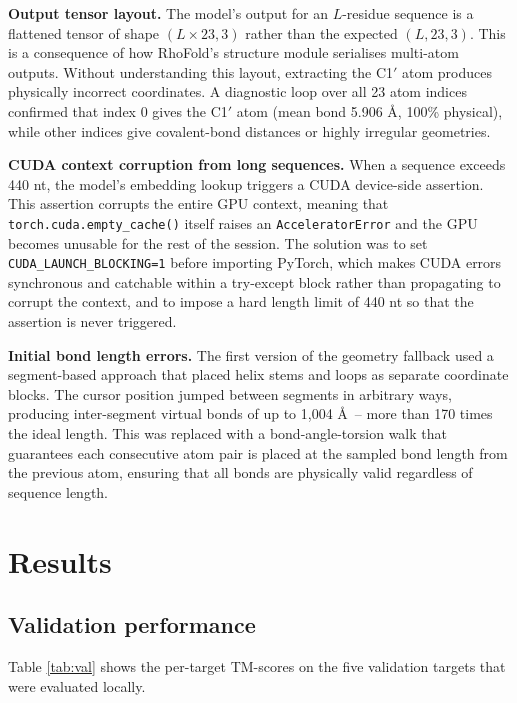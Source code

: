 \documentclass[11pt,a4paper]{article}
\begin{document}
\textbf{Output tensor layout.} The model's output for an $L$-residue sequence is a flattened tensor of shape $(L \times 23, 3)$ rather than the expected $(L, 23, 3)$. This is a consequence of how RhoFold's structure module serialises multi-atom outputs. Without understanding this layout, extracting the C1$'$ atom produces physically incorrect coordinates. A diagnostic loop over all 23 atom indices confirmed that index 0 gives the C1$'$ atom (mean bond 5.906 \AA, 100\% physical), while other indices give covalent-bond distances or highly irregular geometries.

\textbf{CUDA context corruption from long sequences.} When a sequence exceeds 440 nt, the model's embedding lookup triggers a CUDA device-side assertion. This assertion corrupts the entire GPU context, meaning that \texttt{torch.cuda.empty\_cache()} itself raises an \texttt{AcceleratorError} and the GPU becomes unusable for the rest of the session. The solution was to set \texttt{CUDA\_LAUNCH\_BLOCKING=1} before importing PyTorch, which makes CUDA errors synchronous and catchable within a try-except block rather than propagating to corrupt the context, and to impose a hard length limit of 440 nt so that the assertion is never triggered.

\textbf{Initial bond length errors.} The first version of the geometry fallback used a segment-based approach that placed helix stems and loops as separate coordinate blocks. The cursor position jumped between segments in arbitrary ways, producing inter-segment virtual bonds of up to 1,004 \AA\ -- more than 170 times the ideal length. This was replaced with a bond-angle-torsion walk that guarantees each consecutive atom pair is placed at the sampled bond length from the previous atom, ensuring that all bonds are physically valid regardless of sequence length.

\section{Results}

\subsection{Validation performance}

Table \ref{tab:val} shows the per-target TM-scores on the five validation targets that were evaluated locally.
\end{document}
